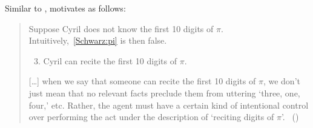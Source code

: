 \begin{note}
  Similar to \citeauthor{Mandelkern:2017aa}, \textcite{Schwarz:2020aa} motivates \AbControl{} as follows:

  \begin{quote}
    Suppose Cyril does not know the first 10 digits of \(\pi\).
    Intuitively,~\ref{Schwarz:pi} is then false.

    \begin{enumerate}[label=(\arabic*), ref=(\arabic*)]
      \setcounter{enumi}{2}
    \item
      \label{Schwarz:pi}
      Cyril can recite the first 10 digits of \(\pi\).
    \end{enumerate}

    [\dots]
    when we say that someone can recite the first 10 digits of \(\pi\), we don't just mean that no relevant facts preclude them from uttering `three, one, four,' etc.
    Rather, the agent must have a certain kind of intentional control over performing the act under the description of `reciting digits of \(\pi\)'.\newline
    \mbox{ }\hfill\mbox{(\citeyear[2]{Schwarz:2020aa})}
  \end{quote}
\end{note}

